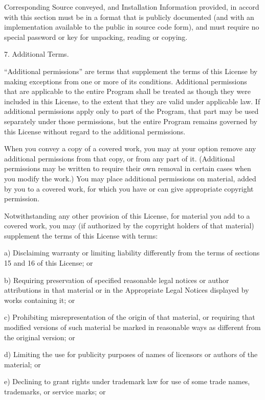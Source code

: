 \documentclass[letterpaper,10pt,english]{sphinxmanual}
\begin{document}
\begin{sphinxVerbatim}[commandchars=\\\{\}]
   Corresponding Source conveyed, and Installation Information provided, in
   accord with this section must be in a format that is publicly documented
   (and with an implementation available to the public in source code form),
   and must require no special password or key for unpacking, reading or
   copying.

 7. Additional Terms.

    “Additional permissions” are terms that supplement the terms of this
    License by making exceptions from one or more of its conditions. Additional
    permissions that are applicable to the entire Program shall be treated as
    though they were included in this License, to the extent that they are
    valid under applicable law. If additional permissions apply only to part of
    the Program, that part may be used separately under those permissions, but
    the entire Program remains governed by this License without regard to the
    additional permissions.

    When you convey a copy of a covered work, you may at your option remove any
    additional permissions from that copy, or from any part of it. (Additional
    permissions may be written to require their own removal in certain cases
    when you modify the work.) You may place additional permissions on
    material, added by you to a covered work, for which you have or can give
    appropriate copyright permission.

    Notwithstanding any other provision of this License, for material you add
    to a covered work, you may (if authorized by the copyright holders of that
    material) supplement the terms of this License with terms:

    a) Disclaiming warranty or limiting liability differently from the terms of
       sections 15 and 16 of this License; or

    b) Requiring preservation of specified reasonable legal notices or author
       attributions in that material or in the Appropriate Legal Notices
       displayed by works containing it; or

    c) Prohibiting misrepresentation of the origin of that material, or
       requiring that modified versions of such material be marked in
       reasonable ways as different from the original version; or

    d) Limiting the use for publicity purposes of names of licensors or authors
       of the material; or

    e) Declining to grant rights under trademark law for use of some trade
       names, trademarks, or service marks; or


\end{sphinxVerbatim}
\end{document}
